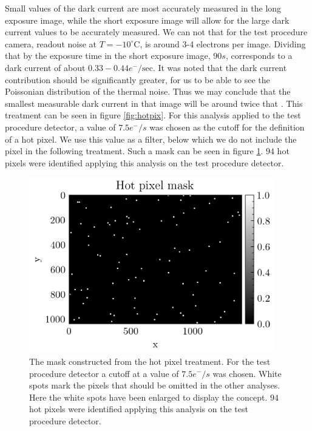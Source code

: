 \documentclass[../main.tex]{subfiles}
\begin{document}
		Small values of the dark current are most accurately measured in the long exposure image, while the short exposure image will allow for the large dark current values to be accurately measured. We can not that for the test procedure camera, readout noise at $T = -10^\circ$C, is around 3-4 electrons per image. Dividing that by the exposure time in the short exposure image, $90s$, corresponds to a dark current of about $0.33-0.44 e^-/\text{sec}$. It was noted that the dark current contribution should be significantly greater, for us to be able to see the Poissonian distribution of the thermal noise. Thus we may conclude that the smallest measurable dark current in that image will be around twice that \cite{CCDdatareductionguide}. This treatment can be seen in figure \ref{fig:hotpix}. For this analysis applied to the test procedure detector, a value of $7.5 e^-/s$ was chosen as the cutoff for the definition of a hot pixel. We use this value as a filter, below which we do not include the pixel in the following treatment. Such a mask can be seen in figure \ref{fig:hotpixmask}. $94$ hot pixels were identified applying this analysis on the test procedure detector.
		
		\begin{figure}
			\centering			\includegraphics[width=0.95\textwidth]{hot_pixel_mask.png}
			\caption{The mask constructed from the hot pixel treatment. For the test procedure detector a cutoff at a value of $7.5 e^-/s$ was chosen. White spots mark the pixels that should be omitted in the other analyses. Here the white spots have been enlarged to display the concept. $94$ hot pixels were identified applying this analysis on the test procedure detector.}
			\label{fig:hotpixmask}
		\end{figure}
		
\end{document}
